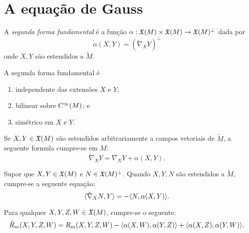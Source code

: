\section{A equação de Gauss}

\begin{definicao}
	A \emph{segunda forma fundamental} é a função $\alpha: \mathfrak{X}(M) \times \mathfrak{X}(M) \rightarrow \mathfrak{X}(M)^\perp$ dada por
	\begin{equation*}
		\alpha(X,Y) = (\tilde{\nabla}_X Y)^\perp
	\end{equation*} 
	onde $X,Y$ são estendidos a $\tilde{M}$.
\end{definicao}

\begin{lema}
	A segunda forma fundamental é
	\begin{enumerate}
		\item independente das extensões $X$ e $Y$;
		\item bilinear sobre $C^\infty(M)$; e
		\item simétrico em $X$ e $Y$.
	\end{enumerate}
\end{lema}

\begin{teorema}
	Se $X,Y \in \mathfrak{X}(M)$ são estendidos arbitrariamente a campos vetoriais de $\tilde{M}$, a seguente formula cumpre-se em $M$:
	\begin{equation*}
		\tilde{\nabla}_X Y = \nabla_X Y + \alpha(X,Y).
	\end{equation*}
\end{teorema}

\begin{lema}
	Supor que $X,Y \in \mathfrak{X}(M)$ e $N \in \mathfrak{X}(M)^\perp$. Quando $X,Y,N$ são estendidos a $\tilde{M}$, cumpre-se a seguente equação:
	\begin{equation*}
		\langle \tilde{\nabla}_X N,Y \rangle = -\langle N,\alpha(X,Y) \rangle.
	\end{equation*}
\end{lema}

\begin{teorema}
	Para qualquer $X,Y,Z,W \in \mathfrak{X}(M)$, cumpre-se o seguente:
	\begin{equation*}
		\tilde{R}_m(X,Y,Z,W) = R_m(X,Y,Z,W) - \langle \alpha(X,W),\alpha(Y,Z) \rangle + \langle \alpha(X,Z),\alpha(Y,W) \rangle.
	\end{equation*}
\end{teorema}

